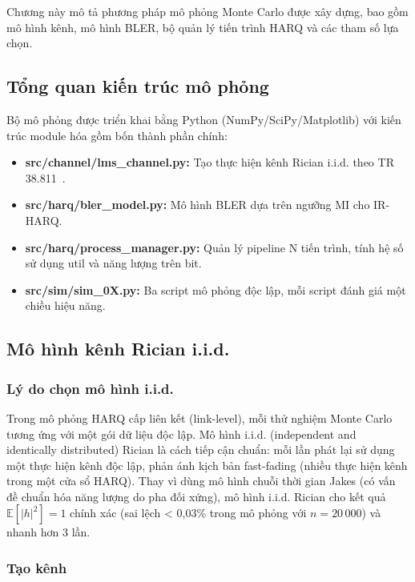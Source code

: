 Chương này mô tả phương pháp mô phỏng Monte Carlo được xây dựng, bao gồm mô hình kênh, mô hình BLER, bộ quản lý tiến trình HARQ và các tham số lựa chọn.

\subsection{Tổng quan kiến trúc mô phỏng}

Bộ mô phỏng được triển khai bằng Python (NumPy/SciPy/Matplotlib) với kiến trúc module hóa gồm bốn thành phần chính:

\begin{itemize}
    \item \textbf{src/channel/lms\_channel.py:} Tạo thực hiện kênh Rician i.i.d. theo TR 38.811~\cite{tr38811}.
    \item \textbf{src/harq/bler\_model.py:} Mô hình BLER dựa trên ngưỡng MI cho IR-HARQ.
    \item \textbf{src/harq/process\_manager.py:} Quản lý pipeline N tiến trình, tính hệ số sử dụng util và năng lượng trên bit.
    \item \textbf{src/sim/sim\_0X.py:} Ba script mô phỏng độc lập, mỗi script đánh giá một chiều hiệu năng.
\end{itemize}

\subsection{Mô hình kênh Rician i.i.d.}

\subsubsection{Lý do chọn mô hình i.i.d.}

Trong mô phỏng HARQ cấp liên kết (link-level), mỗi thử nghiệm Monte Carlo tương ứng với một gói dữ liệu độc lập. Mô hình i.i.d. (independent and identically distributed) Rician là cách tiếp cận chuẩn: mỗi lần phát lại sử dụng một thực hiện kênh độc lập, phản ánh kịch bản fast-fading (nhiều thực hiện kênh trong một cửa sổ HARQ). Thay vì dùng mô hình chuỗi thời gian Jakes (có vấn đề chuẩn hóa năng lượng do pha đối xứng), mô hình i.i.d. Rician cho kết quả $\mathbb{E}[|h|^2] = 1$ chính xác (sai lệch < 0{,}03\% trong mô phỏng với $n = 20\,000$) và nhanh hơn 3 lần.

\subsubsection{Tạo kênh}


